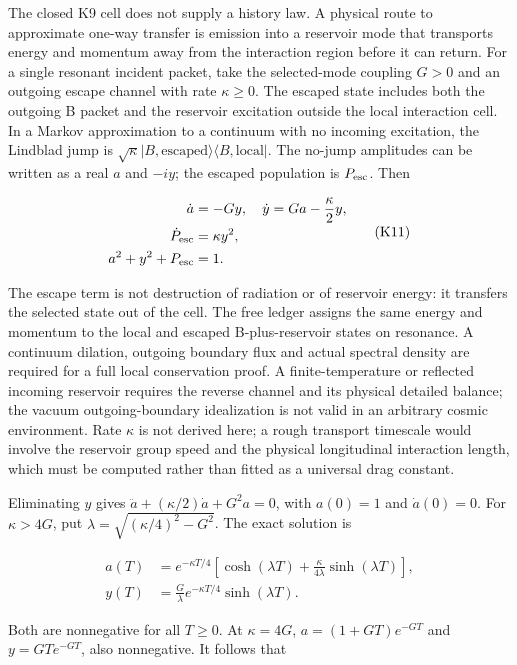 \documentclass[
  11pt,
  twoside]{article}
\begin{document}
The closed K9 cell does not supply a history law. A physical route to
approximate one-way transfer is emission into a reservoir mode that
transports energy and momentum away from the interaction region before
it can return. For a single resonant incident packet, take the
selected-mode coupling \(G>0\) and an outgoing escape channel with rate
\(\kappa\geq0\). The escaped state includes both the outgoing B packet
and the reservoir excitation outside the local interaction cell. In a
Markov approximation to a continuum with no incoming excitation, the
Lindblad jump is
\(\sqrt{\kappa}|B,\mathrm{escaped}\rangle\langle B,\mathrm{local}|\).
The no-jump amplitudes can be written as a real \(a\) and \(-i y\); the
escaped population is \(P_{\rm esc}\). Then

\[\begin{aligned}
\dot a&=-Gy,\quad \dot y=Ga-\frac\kappa2 y,\\
\dot P_{\rm esc}&=\kappa y^2,\\
a^2+y^2+P_{\rm esc}&=1.
\end{aligned}\tag{K11}\]

The escape term is not destruction of radiation or of reservoir energy:
it transfers the selected state out of the cell. The free ledger assigns
the same energy and momentum to the local and escaped B-plus-reservoir
states on resonance. A continuum dilation, outgoing boundary flux and
actual spectral density are required for a full local conservation
proof. A finite-temperature or reflected incoming reservoir requires the
reverse channel and its physical detailed balance; the vacuum
outgoing-boundary idealization is not valid in an arbitrary cosmic
environment. Rate \(\kappa\) is not derived here; a rough transport
timescale would involve the reservoir group speed and the physical
longitudinal interaction length, which must be computed rather than
fitted as a universal drag constant.

Eliminating \(y\) gives \(\ddot a+(\kappa/2)\dot a+G^2a=0\), with
\(a(0)=1\) and \(\dot a(0)=0\). For \(\kappa>4G\), put
\(\lambda=\sqrt{(\kappa/4)^2-G^2}\). The exact solution is

\[\begin{aligned}
a(T)&=e^{-\kappa T/4}\left[\cosh(\lambda T)+\frac{\kappa}{4\lambda}\sinh(\lambda T)\right],\\
y(T)&=\frac{G}{\lambda}e^{-\kappa T/4}\sinh(\lambda T).
\end{aligned}\tag{K12}\]

Both are nonnegative for all \(T\geq0\). At \(\kappa=4G\),
\(a=(1+GT)e^{-GT}\) and \(y=GT e^{-GT}\), also nonnegative. It follows
that
\end{document}
